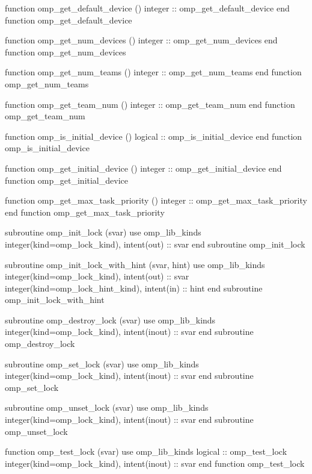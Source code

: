 {\begin{codepar}
          function omp\_get\_default\_device ()
           integer :: omp\_get\_default\_device
          end function omp\_get\_default\_device

          function omp\_get\_num\_devices ()
           integer :: omp\_get\_num\_devices
          end function omp\_get\_num\_devices

          function omp\_get\_num\_teams ()
           integer :: omp\_get\_num\_teams
          end function omp\_get\_num\_teams

          function omp\_get\_team\_num ()
           integer :: omp\_get\_team\_num
          end function omp\_get\_team\_num

          function omp\_is\_initial\_device ()
           logical :: omp\_is\_initial\_device
          end function omp\_is\_initial\_device

          function omp\_get\_initial\_device ()
           integer :: omp\_get\_initial\_device
          end function omp\_get\_initial\_device

          function omp\_get\_max\_task\_priority ()
           integer :: omp\_get\_max\_task\_priority
          end function omp\_get\_max\_task\_priority

          subroutine omp\_init\_lock (svar)
           use omp\_lib\_kinds
           integer(kind=omp\_lock\_kind), intent(out) :: svar
          end subroutine omp\_init\_lock

          subroutine omp\_init\_lock\_with\_hint (svar, hint)
           use omp\_lib\_kinds
           integer(kind=omp\_lock\_kind), intent(out) :: svar
           integer(kind=omp\_lock\_hint\_kind), intent(in) :: hint
          end subroutine omp\_init\_lock\_with\_hint

          subroutine omp\_destroy\_lock (svar)
           use omp\_lib\_kinds
           integer(kind=omp\_lock\_kind), intent(inout) :: svar
          end subroutine omp\_destroy\_lock

          subroutine omp\_set\_lock (svar)
           use omp\_lib\_kinds
           integer(kind=omp\_lock\_kind), intent(inout) :: svar
          end subroutine omp\_set\_lock

          subroutine omp\_unset\_lock (svar)
           use omp\_lib\_kinds
           integer(kind=omp\_lock\_kind), intent(inout) :: svar
          end subroutine omp\_unset\_lock

          function omp\_test\_lock (svar)
           use omp\_lib\_kinds
           logical :: omp\_test\_lock
           integer(kind=omp\_lock\_kind), intent(inout) :: svar
          end function omp\_test\_lock


\end{codepar}}
